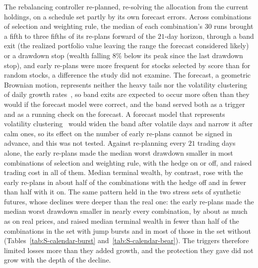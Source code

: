 The rebalancing controller re-planned, re-solving the allocation from the current holdings, on a schedule set partly
by its own forecast errors. Across combinations of selection and weighting rule, the median of each combination's
$30$ runs brought a fifth to three fifths of its re-plans forward of the $21$-day
horizon, through a band exit (the realized portfolio value leaving the range the forecast considered likely) or a
drawdown stop (wealth falling $8\%$ below its peak since the last drawdown stop), and early re-plans were more frequent for stocks selected by
score than for random stocks, a difference the study did not examine. The forecast, a geometric Brownian motion,
represents neither the heavy tails nor the volatility clustering of daily growth rates~\cite{mandelbrot1963,
cont2001}, so band exits are expected to occur more often than they would if the forecast model were correct, and
the band served both as a trigger and as a running check on the forecast. A forecast model that represents
volatility clustering~\cite{engle1982, bollerslev1986} would widen the band after volatile days and narrow it after
calm ones, so its effect on the number of early re-plans cannot be signed in advance, and this was not tested.
Against re-planning every $21$ trading days alone, the early re-plans made the median worst drawdown smaller in most
combinations of selection and weighting rule, with the hedge on or off, and raised trading cost in all of them.
Median terminal wealth, by contrast, rose with the early re-plans in about half of the combinations with the hedge
off and in fewer than half with it on. The same pattern held in the two stress sets of synthetic futures, whose
declines were deeper than the real one: the early re-plans made the median worst drawdown smaller in nearly every
combination, by about as much as on real prices, and raised median terminal wealth in fewer than half of the
combinations in the set with jump bursts and in most of those in the set without (Tables~\ref{tab:S-calendar-burst} and~\ref{tab:S-calendar-bear}).
The triggers therefore limited losses more than they added growth, and the protection they gave did not grow with
the depth of the decline.

